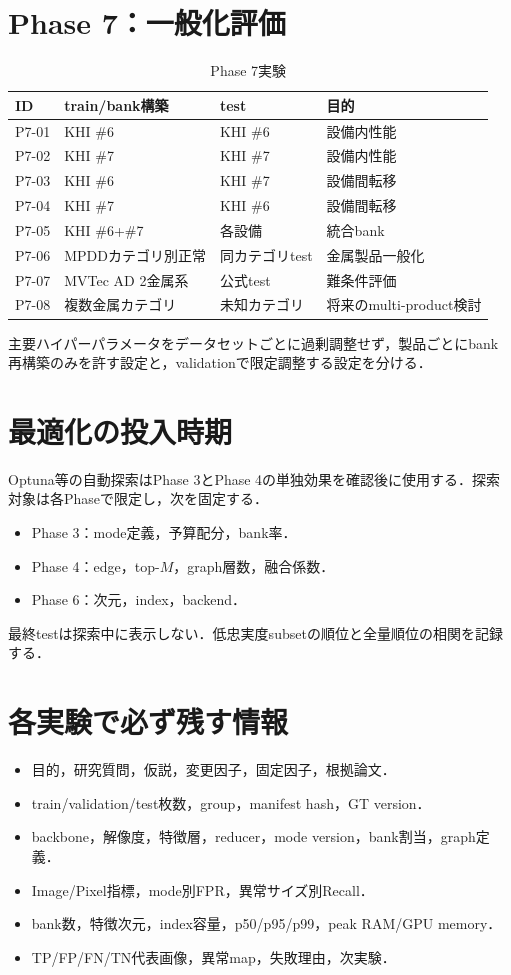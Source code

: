 \documentclass[a4paper,11pt]{ltjsarticle}
\begin{document}
\section{Phase 7：一般化評価}
\begin{table}[H]
\centering\small
\caption{Phase 7実験}
\begin{tabularx}{\linewidth}{L{17mm}L{47mm}L{40mm}Y}
\toprule
ID & train/bank構築 & test & 目的 \\
\midrule
P7-01 & KHI \#6 & KHI \#6 & 設備内性能 \\
P7-02 & KHI \#7 & KHI \#7 & 設備内性能 \\
P7-03 & KHI \#6 & KHI \#7 & 設備間転移 \\
P7-04 & KHI \#7 & KHI \#6 & 設備間転移 \\
P7-05 & KHI \#6+\#7 & 各設備 & 統合bank \\
P7-06 & MPDDカテゴリ別正常 & 同カテゴリtest & 金属製品一般化 \\
P7-07 & MVTec AD 2金属系 & 公式test & 難条件評価 \\
P7-08 & 複数金属カテゴリ & 未知カテゴリ & 将来のmulti-product検討 \\
\bottomrule
\end{tabularx}
\end{table}
主要ハイパーパラメータをデータセットごとに過剰調整せず，製品ごとにbank再構築のみを許す設定と，validationで限定調整する設定を分ける．

\section{最適化の投入時期}
Optuna等の自動探索はPhase 3とPhase 4の単独効果を確認後に使用する．探索対象は各Phaseで限定し，次を固定する．
\begin{itemize}
  \item Phase 3：mode定義，予算配分，bank率．
  \item Phase 4：edge，top-$M$，graph層数，融合係数．
  \item Phase 6：次元，index，backend．
\end{itemize}
最終testは探索中に表示しない．低忠実度subsetの順位と全量順位の相関を記録する．

\section{各実験で必ず残す情報}
\begin{itemize}
  \item 目的，研究質問，仮説，変更因子，固定因子，根拠論文．
  \item train/validation/test枚数，group，manifest hash，GT version．
  \item backbone，解像度，特徴層，reducer，mode version，bank割当，graph定義．
  \item Image/Pixel指標，mode別FPR，異常サイズ別Recall．
  \item bank数，特徴次元，index容量，p50/p95/p99，peak RAM/GPU memory．
  \item TP/FP/FN/TN代表画像，異常map，失敗理由，次実験．
\end{itemize}
\end{document}
